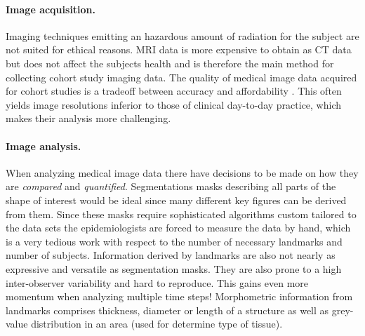 \documentclass[journal]{style/vgtc}           %
\begin{document}
\paragraph{Image acquisition.} \label{ImageAcquisition} Imaging techniques emitting an hazardous amount of radiation for the subject are not suited for ethical reasons.
%
MRI data is more expensive to obtain as CT data but does not affect the subjects health and is therefore the main method for collecting cohort study imaging data.
%
The quality of medical image data acquired for cohort studies is a tradeoff between accuracy and affordability \cite{Preim2014}.
%
This often yields image resolutions inferior to those of clinical day-to-day practice, which makes their analysis more challenging.

\paragraph{Image analysis.} \label{ImageAnalysis} When analyzing medical image data there have decisions to be made on how they are \emph{compared} and \emph{quantified}.
%
Segmentations masks describing all parts of the shape of interest would be ideal since many different key figures can be derived from them.
%
Since these masks require sophisticated algorithms custom tailored to the data sets the epidemiologists are forced to measure the data by hand, which is a very tedious work with respect to the number of necessary landmarks and number of subjects.
%
Information derived by landmarks are also not nearly as expressive and versatile as segmentation masks.
%
They are also prone to a high inter-observer variability and hard to reproduce.
%
This gains even more momentum when analyzing multiple time steps!
%
Morphometric information from landmarks comprises thickness, diameter or length of a structure as well as grey-value distribution in an area (used for determine type of tissue).

\end{document}
